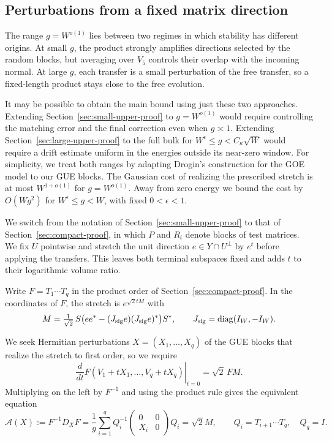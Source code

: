 \documentclass[11pt]{article}
\numberwithin{equation}{section}
\theoremstyle{remark}
\begin{document}
\subsection{Perturbations from a fixed matrix direction}
\label{sec:intro-fixed-fields}

The range $g=W^{o(1)}$ lies between two regimes in which stability
has different origins. At small $g$, the product strongly amplifies
directions selected by the random blocks, but averaging over $V_5$
controls their overlap with the incoming normal. At large $g$, each
transfer is a small perturbation of the free transfer, so a fixed-length
product stays close to the free evolution.

It may be possible to obtain the main bound using just these two
approaches. Extending Section~\ref{sec:small-upper-proof} to $g=W^{o(1)}$
would require controlling the matching error and the final correction
even when $g\asymp1$. Extending Section~\ref{sec:large-upper-proof} to
the full bulk for $W^\epsilon\le g<C_\kappa\sqrt W$ would require a
drift estimate uniform in the energies outside its near-zero window.
For simplicity, we treat both ranges by adapting Drogin's construction
for the GOE model \cite[Section~4]{Drogin} to our GUE blocks. The Gaussian cost of realizing
the prescribed stretch is at most $W^{1+o(1)}$ for $g=W^{o(1)}$.
Away from zero energy we bound the cost by $O(Wg^2)$ for
$W^\epsilon\le g<W$, with fixed $0<\epsilon<1$.

We switch from the notation of
Section~\ref{sec:small-upper-proof} to that of Section~\ref{sec:compact-proof},
in which $P$ and $R_i$ denote blocks of test matrices. We fix $U$
pointwise and stretch the unit
direction $e\in Y\cap U^\perp$ by $e^t$ before applying the transfers.
This leaves both terminal subspaces fixed and adds $t$ to their
logarithmic volume ratio.

Write $F=T_1\cdots T_q$ in the product order of
Section~\ref{sec:compact-proof}. In the coordinates of $F$, the stretch
is $e^{\sqrt2 tM}$ with
\[
 M=\tfrac1{\sqrt2}\,S\bigl(ee^*-(J_{\rm sig}e)(J_{\rm sig}e)^*\bigr)S^*,
 \qquad J_{\rm sig}=\operatorname{diag}(I_W,-I_W).
\]

We seek Hermitian perturbations $X=(X_1,\ldots,X_q)$ of the GUE blocks
that realize the stretch to first order, so we require
\[
 \left.\frac{d}{dt}F(V_1+tX_1,\ldots,V_q+tX_q)\right|_{t=0}
 =\sqrt2\,FM .
\]
Multiplying on the left by $F^{-1}$ and using the product rule gives
the equivalent equation
\[
 \mathcal A(X):=F^{-1}D_XF
 =\frac1g\sum_{i=1}^q Q_i^{-1}
     \begin{pmatrix}0&0\\ X_i&0\end{pmatrix}Q_i=\sqrt2 M,
 \qquad Q_i=T_{i+1}\cdots T_q,\quad Q_q=I .
\]
\end{document}
